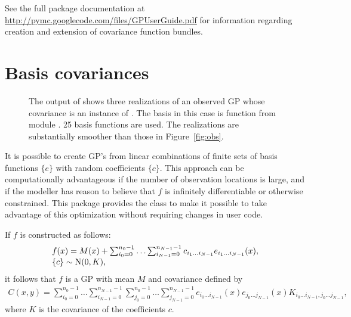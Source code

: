 \documentclass[article]{jss}
\begin{document}
See the full package documentation at \href{http://pymc.googlecode.com/files/GPUserGuide.pdf}{http://pymc.googlecode.com/files/GPUserGuide.pdf} for information regarding creation and extension of covariance function bundles.

\section{Basis covariances}\label{sec:basis}

\begin{figure}[htbp]
    \centering
        \caption{The output of  shows three realizations of an observed GP whose covariance is an instance of . The basis in this case is function  from module . 25 basis functions are used. The realizations are substantially smoother than those in Figure~\ref{fig:obs}.}
    \label{fig:basiscov}
\end{figure}

It is possible to create GP's from linear combinations of finite sets of basis functions $\{e\}$ with random coefficients $\{c\}$. This approach can be computationally advantageous if the number of observation locations is large, and if the modeller has reason to believe that $f$ is infinitely differentiable or otherwise constrained. This package provides the  class to make it possible to take advantage of this optimization without requiring changes in user code. 

If $f$ is constructed as follows:
\begin{equation}
    \label{eq:basis-construction} 
    \begin{array}{l}
        f(x) = M(x) + \sum_{i_0=0}^{n_0-1}\ldots \sum_{i_{N-1}=0}^{n_{N-1}-1} c_{i_1\ldots i_{N-1}} e_{i_1\ldots i_{N-1}}(x), \\
        \{c\}\sim \textup{N}(0,K),
    \end{array}
\end{equation}
it follows that $f$ is a GP with mean $M$ and covariance defined by
\begin{eqnarray*}
    C(x,y)=\sum_{i_0=0}^{n_0-1}\ldots \sum_{i_{N-1}=0}^{n_{N-1}-1} \sum_{j_0=0}^{n_0-1}\ldots \sum_{j_{N-1}=0}^{n_{N-1}-1} e_{i_0\ldots i_{N-1}}(x) e_{j_0\ldots j_{N-1}}(x) K_{i_0\ldots i_{N-1}, j_0\ldots j_{N-1}},
\end{eqnarray*}
where $K$ is the covariance of the coefficients $c$.
\end{document}
